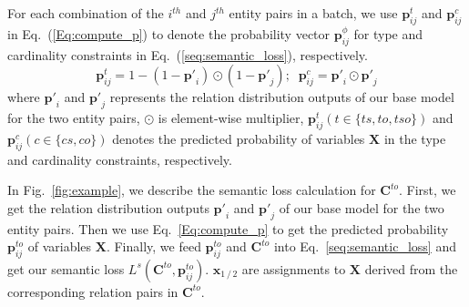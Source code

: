 For each combination of the $i^{th}$ and $j^{th}$ entity pairs in a batch, we use $\bm{p}_{ij}^{t}$ and $\bm{p}_{ij}^{c}$ in Eq.~(\ref{Eq:compute_p}) to denote the probability vector $\bm{p}^{\phi}_{ij}$ for type and cardinality constraints in Eq.~(\ref{seq:semantic_loss}), respectively.
\begin{equation}
\label{Eq:compute_p}
\bm{p}_{ij}^{t} = 1-(1-\bm{p'}_{i}) \odot (1-\bm{p'}_{j});\;\; \bm{p}_{ij}^{c} = \bm{p'}_{i} \odot \bm{p'}_{j}
\end{equation}
where $\bm{p'}_i$ and $\bm{p'}_j$ represents the relation distribution outputs of our base model for the two entity pairs,
$\odot$ is element-wise multiplier,
$\bm{p}_{ij}^{t}(t \in \{ts, to, tso\})$ and $\bm{p}_{ij}^{c}(c \in \{cs, co\})$ denotes the predicted probability of variables $\bm{X}$ in the type and cardinality constraints, respectively.

In Fig.~\ref{fig:example},
we describe the semantic loss calculation for $\bm{C}^{to}$.
First, we get the relation distribution outputs $\bm{p'}_i$ and $\bm{p'}_j$ of our base model for the two entity pairs.
Then we use Eq.~\ref{Eq:compute_p} to get the predicted probability $\bm{p}^{to}_{ij}$ of variables $\bm{X}$.
Finally, we feed $\bm{p}^{to}_{ij}$ and $\bm{C}^{to}$ into Eq.~\ref{seq:semantic_loss} and get our semantic loss $L^{s}(\bm{C}^{to}, \bm{p}^{to}_{ij})$.
$\bm{x}_{1\,/\,2}$ are assignments to $\bm{X}$ derived from the corresponding relation pairs in $\bm{C}^{to}$.

\iffalse


